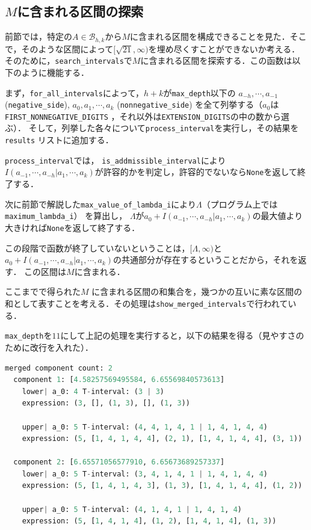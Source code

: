 \documentclass[10pt,a4paper]{ujarticle}
\theoremstyle{definition}
\begin{document}
\subsection{$M$に含まれる区間の探索}
前節では，特定の$A\in \mathcal{B}_{h,k}$から$M$に含まれる区間を構成できることを見た．そこで，そのような区間によって$[\sqrt{21},\infty)$を埋め尽くすことができないか考える．
そのために，\verb|search_intervals|で$M$に含まれる区間を探索する．この函数は以下のように機能する．

まず，\verb|for_all_intervals|によって，$h + k$が\verb|max_depth|以下の
$a_{-h},\cdots, a_{-1}$ (\verb|negative_side|), $a_0, a_{1},\cdots, a_{k}$ (\verb|nonnegative_side|)
を全て列挙する（$a_0$は\verb|FIRST_NONNEGATIVE_DIGITS| ，それ以外は\verb|EXTENSION_DIGITS|の中の数から選ぶ）．
そして，列挙した各々について\verb|process_interval|を実行し，その結果を\verb|results| リストに追加する．

\verb|process_interval|では，
\verb|is_addmissible_interval|により$I(a_{-1},\cdots, a_{-h} | a_{1},\cdots, a_{k} )$が許容的かを判定し，許容的でないなら\verb|None|を返して終了する．

次に前節で解説した\verb|max_value_of_lambda_i|により$\Lambda$（プログラム上では\verb|maximum_lambda_i|） を算出し，
$\Lambda$が$a_0 + I(a_{-1},\cdots, a_{-h} | a_{1},\cdots, a_{k} )$の最大値より大きければ\verb|None|を返して終了する．

この段階で函数が終了していないということは，$[\Lambda,\infty)$と$a_0 + I(a_{-1},\cdots, a_{-h} | a_{1},\cdots, a_{k} )$の共通部分が存在するということだから，それを返す．
この区間は$M$に含まれる．

ここまでで得られた$M$ に含まれる区間の和集合を，幾つかの互いに素な区間の和として表すことを考える．その処理は\verb|show_merged_intervals|で行われている．

\verb|max_depth|を$11$にして上記の処理を実行すると，以下の結果を得る（見やすさのために改行を入れた）．
\begin{lstlisting}[language=python]
  merged component count: 2
  component 1: [4.58257569495584, 6.65569840573613]
    lower| a_0: 4 T-interval: (3 | 3) 
    expression: (3, [], (1, 3), [], (1, 3))

    upper| a_0: 5 T-interval: (4, 4, 1, 4, 1 | 1, 4, 1, 4, 4) 
    expression: (5, [1, 4, 1, 4, 4], (2, 1), [1, 4, 1, 4, 4], (3, 1))
  
  component 2: [6.65571056577910, 6.65673689257337]
    lower| a_0: 5 T-interval: (3, 4, 1, 4, 1 | 1, 4, 1, 4, 4) 
    expression: (5, [1, 4, 1, 4, 3], (1, 3), [1, 4, 1, 4, 4], (1, 2))
    
    upper| a_0: 5 T-interval: (4, 1, 4, 1 | 1, 4, 1, 4) 
    expression: (5, [1, 4, 1, 4], (1, 2), [1, 4, 1, 4], (1, 3))
\end{lstlisting}
\end{document}
